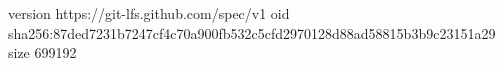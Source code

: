version https://git-lfs.github.com/spec/v1
oid sha256:87ded7231b7247cf4c70a900fb532c5cfd2970128d88ad58815b3b9c23151a29
size 699192

